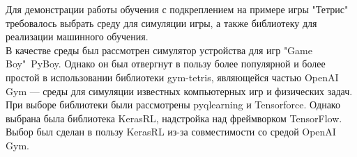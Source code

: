 \documentclass{article}
\begin{document}
Для демонстрации работы обучения с подкреплением на примере игры "Тетрис" требовалось выбрать среду для симуляции игры, а также библиотеку для реализации машинного обучения.\\
В качестве среды был рассмотрен симулятор устройства для игр "Game Boy"\ PyBoy\cite{litlink11}. Однако он был отвергнут в пользу более популярной и более простой в использовании библиотеки gym-tetris\cite{litlink12}, являющейся частью OpenAI Gym\cite{litlink13} — среды для симуляции известных компьютерных игр и физических задач.\\
При выборе библиотеки были рассмотрены pyqlearning\cite{litlink14} и Tensorforce\cite{litlink15}. Однако выбрана была библиотека KerasRL\cite{litlink16}, надстройка над фреймворком TensorFlow\cite{litlink17}. Выбор был сделан в пользу KerasRL из-за совместимости со средой OpenAI Gym.
\newpage
\end{document}
